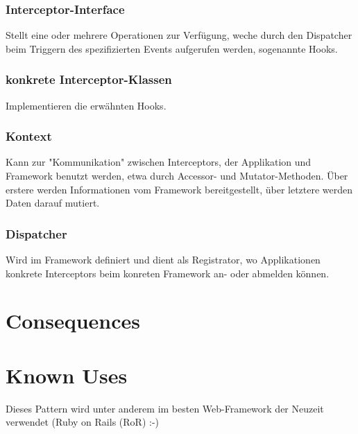 \subsubsection{Interceptor-Interface}
Stellt eine oder mehrere Operationen zur Verfügung, weche durch den Dispatcher beim Triggern des spezifizierten Events aufgerufen werden, sogenannte Hooks.
\subsubsection{konkrete Interceptor-Klassen}
Implementieren die erwähnten Hooks.
\subsubsection{Kontext}
Kann zur "Kommunikation" zwischen Interceptors, der Applikation und Framework benutzt werden, etwa durch Accessor- und Mutator-Methoden. Über erstere werden Informationen vom Framework bereitgestellt, über letztere werden Daten darauf mutiert.
\subsubsection{Dispatcher}
Wird im Framework definiert und dient als Registrator, wo Applikationen konkrete Interceptors beim konreten Framework an- oder abmelden können.

\section{Consequences}
\begin{itemize}
\end{itemize}

\section{Known Uses}
Dieses Pattern wird unter anderem im besten Web-Framework der Neuzeit verwendet (Ruby on Rails (RoR) :-)

